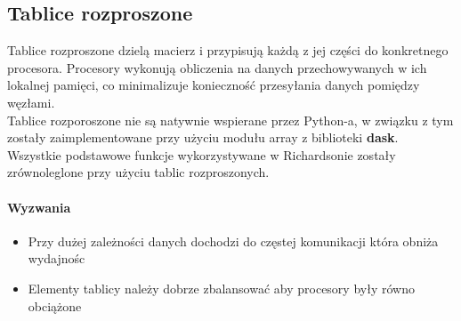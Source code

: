 \subsection{Tablice rozproszone}
Tablice rozproszone dzielą macierz i przypisują każdą z jej części do konkretnego procesora. 
Procesory wykonują obliczenia na danych przechowywanych w ich lokalnej pamięci, co minimalizuje konieczność przesyłania danych pomiędzy węzłami. \\ 
Tablice rozporoszone nie są natywnie wspierane przez Python-a, w związku z tym zostały zaimplementowane przy użyciu modułu array z biblioteki \textbf{dask}. \\ 
Wszystkie podstawowe funkcje wykorzystywane w Richardsonie zostały zrównoleglone przy użyciu tablic rozproszonych.

\paragraph{Wyzwania}
\begin{itemize}
\item Przy dużej zależności danych dochodzi do częstej komunikacji która obniża wydajnośc 
\item Elementy tablicy należy dobrze zbalansować aby procesory były równo obciążone
\end{itemize}

